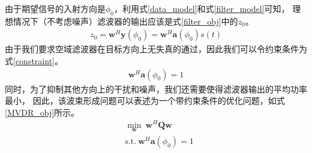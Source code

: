 \documentclass[master]{thesis-uestc}
\begin{document}
由于期望信号的入射方向是$\phi_0$，利用式\eqref{data_model}和式\eqref{filter_model}可知，
理想情况下（不考虑噪声）滤波器的输出应该是式\eqref{filter_obj}中的$z_0$。
\begin{equation}\label{filter_obj}
    \begin{aligned}
    z_0 = \bm{w}^H\bm{y}(\phi_0) = \bm{w}^H\bm{a}(\phi_0)s(t)
    \end{aligned}
\end{equation}
由于我们要求空域滤波器在目标方向上无失真的通过，因此我们可以令约束条件为式\eqref{constraint}。
\begin{equation}\label{constraint}
    \begin{aligned}
    \bm{w}^H\bm{a}(\phi_0) = 1
    \end{aligned}
\end{equation}
同时，为了抑制其他方向上的干扰和噪声，我们还需要使得滤波器输出的平均功率最小，
因此，该波束形成问题可以表述为一个带约束条件的优化问题，如式\eqref{MVDR_obj}所示。
\begin{equation}\label{MVDR_obj}
    \begin{aligned}
    &\min_\bm{w} ~ \bm{w}^H\bm{Q}\bm{w} \\
    &\text{s.t.} ~ \bm{w}^H\bm{a}(\phi_0) = 1
    \end{aligned}
\end{equation}
\end{document}
